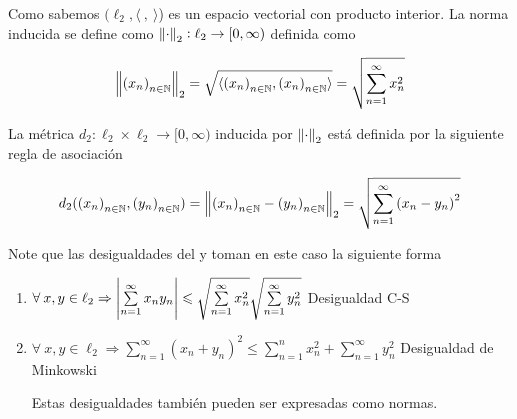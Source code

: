 \begin{remark}
     Como sabemos $(\ell_2, \langle \: , \: \rangle$) es un espacio vectorial con producto interior. La norma inducida se define como ${\norm{\cdot}}_{2} : \ell_2 \to [0,\infty )$ definida como

     \begin{equation*}
        {\norm{{({x}_{n})}_{n \in \ensuremath{\mathbb{N}}}}}_{2} = \sqrt{\langle {({x}_{n})}_{n \in \mathbb{N}}, {({x}_{n})}_{n \in \mathbb{N}} \rangle} = \sqrt{ \sum\limits_{n=1}^{\infty}{x}^{2}_{n}}
     \end{equation*}

     
    La métrica $d_2 : \ell_2 \times \ell_2 \to [0,\infty)$ inducida por ${\norm{\cdot}}_{2}$ está definida por la siguiente regla de asociación

    \begin{equation*}
        d_2 ({({x}_{n})}_{n \in \mathbb{N}}, {({y}_{n})}_{n \in \mathbb{N}}) = \norm{{({x}_{n})}_{n \in \mathbb{N}}-{({y}_{n})}_{n \in \mathbb{N}}}_{2} = \sqrt{ \sum\limits_{n=1}^{\infty}{({x}_{n}-{y}_{n})}^{2}}
    \end{equation*}
     
     
     Note que las desigualdades del  y  toman en este caso la siguiente forma

    \begin{enumerate}
        \item $\forall \: x , y \in \ell_2 \Rightarrow \abs{\sum\limits_{n=1}^{\infty} {x}_{n} {y}_{n}} \leqslant \sqrt{\sum\limits_{n=1}^{\infty} {x}_{n}^{2}} \sqrt{\sum\limits_{n=1}^{\infty} {y}_{n}^{2}}$ \hfill \textcolor{Purple!70!black}{Desigualdad C-S}
        \item $\forall \: x , y \in \ell_2 \Rightarrow \sum\limits_{n=1}^{\infty} {({x}_{n}+{y}_{n})}^{2} \leqslant \sum\limits_{n=1}^{n} {x}_{n}^{2} + \sum\limits_{n=1}^{\infty} {y}_{n}^{2}$ \hfill \textcolor{Purple!70!black}{Desigualdad de Minkowski}

        Estas desigualdades también pueden ser expresadas como normas.
    \end{enumerate}
\end{remark}

